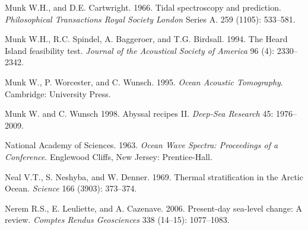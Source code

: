 \begin{thebibliography}{999}
Munk W.H., and D.E. Cartwright.  1966. Tidal spectroscopy and
prediction.  \textit{Philosophical Transactions Royal Society London}
Series A. 259 (1105): 533--581.
%

Munk W.H., R.C. Spindel, A. Baggeroer, and T.G. Birdsall. 1994. The
Heard Island feasibility test. \textit{Journal of the Acoustical
  Society of America} 96 (4): 2330--2342.
%

Munk W., P. Worcester, and C. Wunsch.  1995. \textit{Ocean Acoustic
  Tomography}.  Cambridge: University Press.
%

Munk W. and C. Wunsch 1998. Abyssal recipes II. \textit{Deep-Sea
  Research} 45: 1976--2009.
%

National Academy of Sciences.  1963. \textit{Ocean Wave Spectra:
  Proceedings of a Conference}.  Englewood Cliffs, New Jersey:
Prentice-Hall.
%

Neal V.T., S. Neshyba, and W. Denner.  1969. Thermal stratification in
the Arctic Ocean. \textit{Science} 166 (3903): 373--374.
%

Nerem R.S., E. Leuliette, and A. Cazenave.  2006. Present-day
sea-level change: A review. \textit{Comptes Rendus Geosciences} 338
(14--15): 1077--1083.
%


\end{thebibliography}
